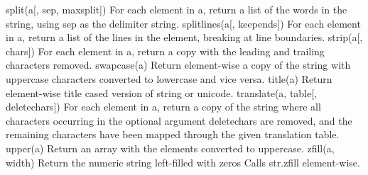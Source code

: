 split(a[, sep, maxsplit])	For each element in a, return a list of the words in the string, using sep as the delimiter string.
splitlines(a[, keepends])	For each element in a, return a list of the lines in the element, breaking at line boundaries.
strip(a[, chars])	For each element in a, return a copy with the leading and trailing characters removed.
swapcase(a)	Return element-wise a copy of the string with uppercase characters converted to lowercase and vice versa.
title(a)	Return element-wise title cased version of string or unicode.
translate(a, table[, deletechars])	For each element in a, return a copy of the string where all characters occurring in the optional argument deletechars are removed, and the remaining characters have been mapped through the given translation table.
upper(a)	Return an array with the elements converted to uppercase.
zfill(a, width)	Return the numeric string left-filled with zeros Calls str.zfill element-wise.
